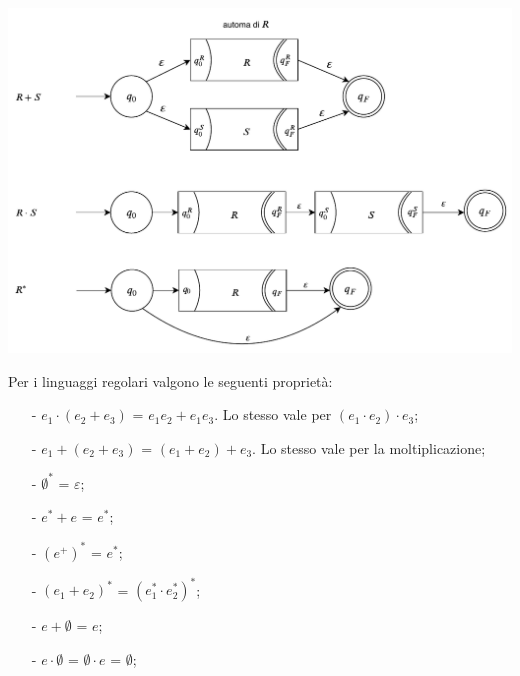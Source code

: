 \documentclass[a4paper, 10pt]{report}
\begin{document}
\begin{tcolorbox}[title=\textbf{Dimostrazione (per induzione) grafica}]
\begin{center}
\includegraphics[scale=0.8]{16ottobre08.pdf}
\end{center}
\end{tcolorbox}

\noindent Per i linguaggi regolari valgono le seguenti proprietà:
\begin{itemize}
\item[-] $e_1 \cdot (e_2 + e_3)$ = $e_1e_2 + e_1e_3$. Lo stesso vale per $(e_1 \cdot e_2) \cdot e_3 $;
\item[-] $e_1 + (e_2 + e_3)$ = $(e_1 + e_2) + e_3$. Lo stesso vale per la moltiplicazione;
\item[-] $\emptyset^*$ = $\varepsilon$;
\item[-] $e^*+e$ = $e^*$;
\item[-] $(e^+)^*$ = $e^*$;
\item[-] $(e_1 + e_2)^*$ = $(e_1^*\cdot e_2^*)^*$;
\item[-] $e+\emptyset$ = $e$;
\item[-] $e \cdot \emptyset$ = $\emptyset \cdot e$ = $\emptyset$;
\end{itemize}
\end{document}
